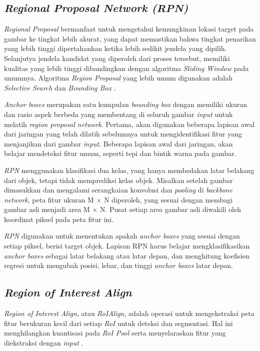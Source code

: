 \subsection{\textit{Regional Proposal Network (RPN)}}
\label{subsec:rpn}

\textit{Regional Proposal} bermanfaat untuk mengetahui kemungkinan lokasi target pada gambar ke tingkat lebih akurat, yang dapat memastikan bahwa tingkat penarikan yang lebih tinggi dipertahankan ketika lebih sedikit jendela yang dipilih. Selanjutya jendela kandidat yang diperoleh dari proses tersebut, memiliki kualitas yang lebih tinggi dibandingkan dengan algoritma \textit{Sliding Window} pada umumnya. Algoritma \textit{Region Proposal} yang lebih umum digunakan adalah \textit{Selective Search} dan \textit{Bounding Box} \citep{rpn}.

\textit{Anchor boxes} merupakan satu kumpulan \textit{bounding box} dengan memiliki ukuran dan rasio aspek berbeda yang membentang di seluruh gambar \textit{input} untuk melatih \textit{region proposal network}. Pertama, akan digunakan beberapa lapisan awal dari jaringan yang telah dilatih sebelumnya untuk mengidentifikasi fitur yang menjanjikan dari gambar \textit{input}. Beberapa lapisan awal dari jaringan, akan belajar mendeteksi fitur umum, seperti tepi dan bintik warna pada gambar.

\textit{RPN} menggunakan klasifikasi dua kelas, yang hanya membedakan latar belakang dari objek, tetapi tidak memprediksi kelas objek. Misalkan setelah gambar dimasukkan dan mengalami serangkaian konvolusi dan \textit{pooling} di \textit{backbone network}, peta fitur ukuran M $\times$ N diperoleh, yang sesuai dengan membagi gambar asli menjadi area M $\times$ N. Pusat setiap area gambar asli diwakili oleh koordinat piksel pada peta fitur ini. 

\textit{RPN} digunakan untuk menentukan apakah \textit{anchor boxes} yang sesuai dengan setiap piksel, berisi target objek. Lapisan RPN harus belajar mengklasifikasikan \textit{anchor boxes} sebagai latar belakang atau latar depan, dan menghitung koefisien regresi untuk mengubah posisi, lebar, dan tinggi \textit{anchor boxes} latar depan.

\subsection{\textit{Region of Interest Align}}
\label{roialign}

\textit{Region of Interest Align}, atau \textit{RoIAlign}, adalah operasi untuk mengekstraksi peta fitur berukuran kecil dari setiap \textit{RoI} untuk deteksi dan segmentasi. Hal ini menghilangkan kuantisasi pada \textit{RoI Pool} serta menyelaraskan fitur yang diekstraksi dengan \textit{input} \citep{mask-rcnn}.

